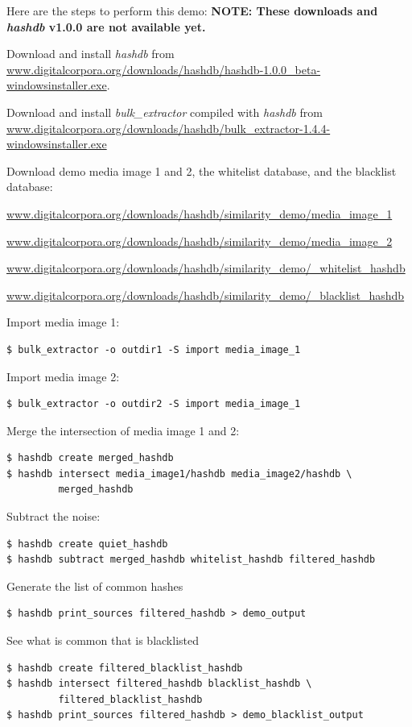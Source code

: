 \documentclass[12pt,twoside]{article}
\newcommand{\hdb}{\emph{hashdb}\xspace}
\newcommand{\bulk}{\emph{bulk\_extractor}\xspace}
\begin{document}
Here are the steps to perform this demo:
\textbf{NOTE: These downloads and \hdb v1.0.0 are not available yet.}
\begin{compactenum}
\item Download and install \hdb from
\url{www.digitalcorpora.org/downloads/hashdb/hashdb-1.0.0\_beta-windowsinstaller.exe}.
\item Download and install \bulk compiled with \hdb from
\url{www.digitalcorpora.org/downloads/hashdb/bulk\_extractor-1.4.4-windowsinstaller.exe}
\item Download demo media image 1 and 2, the whitelist database,
and the blacklist database:
\begin{compactenum}
\item \url{www.digitalcorpora.org/downloads/hashdb/similarity\_demo/media\_image\_1}
\item \url{www.digitalcorpora.org/downloads/hashdb/similarity\_demo/media\_image\_2}
\item \url{www.digitalcorpora.org/downloads/hashdb/similarity\_demo/\_whitelist\_hashdb}
\item \url{www.digitalcorpora.org/downloads/hashdb/similarity\_demo/\_blacklist\_hashdb}
\end{compactenum}

\item Import media image 1:
\begin{verbatim}
$ bulk_extractor -o outdir1 -S import media_image_1
\end{verbatim}

\item Import media image 2:
\begin{verbatim}
$ bulk_extractor -o outdir2 -S import media_image_1
\end{verbatim}

\item Merge the intersection of media image 1 and 2:
\begin{verbatim}
$ hashdb create merged_hashdb
$ hashdb intersect media_image1/hashdb media_image2/hashdb \
         merged_hashdb
\end{verbatim}

\item Subtract the noise:
\begin{verbatim}
$ hashdb create quiet_hashdb
$ hashdb subtract merged_hashdb whitelist_hashdb filtered_hashdb
\end{verbatim}

\item Generate the list of common hashes
\begin{verbatim}
$ hashdb print_sources filtered_hashdb > demo_output
\end{verbatim}

\item See what is common that is blacklisted
\begin{verbatim}
$ hashdb create filtered_blacklist_hashdb
$ hashdb intersect filtered_hashdb blacklist_hashdb \
         filtered_blacklist_hashdb
$ hashdb print_sources filtered_hashdb > demo_blacklist_output
\end{verbatim}
\end{compactenum}
\end{document}

